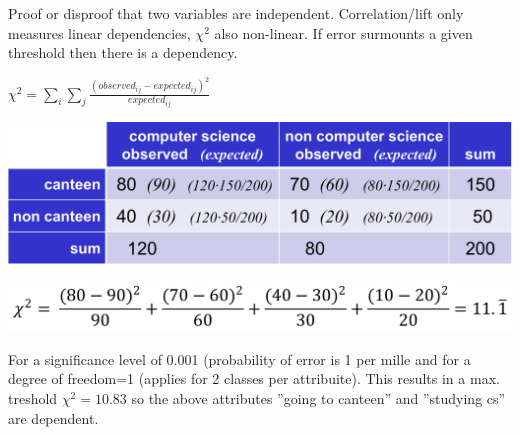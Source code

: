 \begin{breakbox}

Proof or disproof that two variables are independent. Correlation/lift only measures linear dependencies, $\chi ^2$ also non-linear. If error surmounts a given threshold then there is a dependency.
\begin{center}
	$\chi ^2 = \sum_{i}{} \sum_{j}{} \frac{(observed_{ij} - expected_{ij})^2}{expected_{ij}}$
\end{center}

\begin{center}
	\includegraphics[width=.15\textwidth]{slides_images/chi_squared_test_example}
\end{center}

\begin{center}
	\includegraphics[width=.15\textwidth]{slides_images/chi_squared_test_canteen_numbers}
\end{center}

For a significance level of 0.001 (probability of error is 1 per mille and for a degree of freedom=1 (applies for 2 classes per attribuite). This results in a max. treshold $\chi^2 = 10.83$ so the above attributes ''going to canteen'' and ''studying cs'' are dependent.
\end{breakbox}



